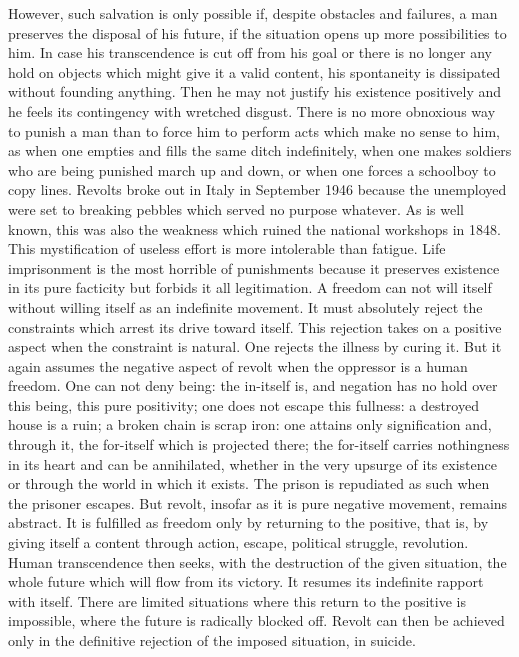 \documentclass[11pt]{article}
\begin{document}
However, such salvation is only possible if, despite obstacles and failures, a man preserves the disposal of his future, if the situation opens up more possibilities to him. In case his transcendence is cut off from his goal or there is no longer any hold on objects which might give it a valid content, his spontaneity is dissipated without founding anything. Then he may not justify his existence positively and he feels its contingency with wretched disgust. There is no more obnoxious way to punish a man than to force him to perform acts which make no sense to him, as when one empties and fills the same ditch indefinitely, when one makes soldiers who are being punished march up and down, or when one forces a schoolboy to copy lines. Revolts broke out in Italy in September 1946 because the unemployed were set to breaking pebbles which served no purpose whatever. As is well known, this was also the weakness which ruined the national workshops in 1848. This mystification of useless effort is more intolerable than fatigue. Life imprisonment is the most horrible of punishments because it preserves existence in its pure facticity but forbids it all legitimation. A freedom can not will itself without willing itself as an indefinite movement. It must absolutely reject the constraints which arrest its drive toward itself. This rejection takes on a positive aspect when the constraint is natural. One rejects the illness by curing it. But it again assumes the negative aspect of revolt when the oppressor is a human freedom. One can not deny being: the in-itself is, and negation has no hold over this being, this pure positivity; one does not escape this fullness: a destroyed house is a ruin; a broken chain is scrap iron: one attains only signification and, through it, the for-itself which is projected there; the for-itself carries nothingness in its heart and can be annihilated, whether in the very upsurge of its existence or through the world in which it exists. The prison is repudiated as such when the prisoner escapes. But revolt, insofar as it is pure negative movement, remains abstract. It is fulfilled as freedom only by returning to the positive, that is, by giving itself a content through action, escape, political struggle, revolution. Human transcendence then seeks, with the destruction of the given situation, the whole future which will flow from its victory. It resumes its indefinite rapport with itself. There are limited situations where this return to the positive is impossible, where the future is radically blocked off. Revolt can then be achieved only in the definitive rejection of the imposed situation, in suicide.
\end{document}
